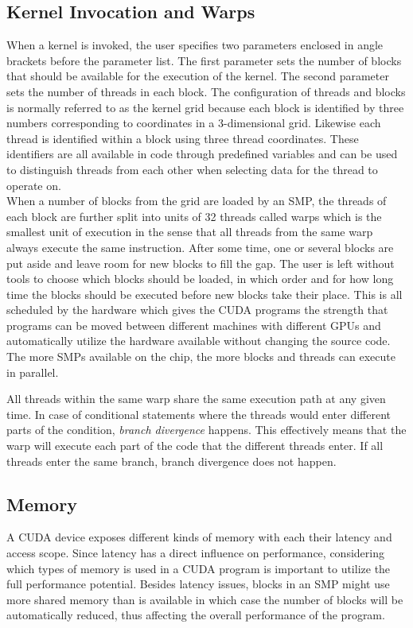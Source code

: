 \subsection{Kernel Invocation and Warps}
\label{sec:kernelandwarps}
When a kernel is invoked, the user specifies two parameters enclosed in angle brackets before the parameter list. The first parameter sets the number of blocks that should be available for the execution of the kernel. The second parameter sets the number of threads in each block. The configuration of threads and blocks is normally referred to as the kernel grid because each block is identified by three numbers corresponding to coordinates in a 3-dimensional grid. Likewise each thread is identified within a block using three thread coordinates. These identifiers are all available in code through predefined variables and can be used to distinguish threads from each other when selecting data for the thread to operate on.\\

When a number of blocks from the grid are loaded by an SMP, the threads of each block are further split into units of 32 threads called warps which is the smallest unit of execution in the sense that all threads from the same warp always execute the same instruction. After some time, one or several blocks are put aside and leave room for new blocks to fill the gap. The user is left without tools to choose which blocks should be loaded, in which order and for how long time the blocks should be executed before new blocks take their place. This is all scheduled by the hardware which gives the CUDA programs the strength that programs can be moved between different machines with different GPUs and automatically utilize the hardware available without changing the source code. The more SMPs available on the chip, the more blocks and threads can execute in parallel.

All threads within the same warp share the same execution path at any given time. In case of conditional statements where the threads would enter different parts of the condition, \emph{branch divergence} happens. This effectively means that the warp will execute each part of the code that the different threads enter. If all threads enter the same branch, branch divergence does not happen.

\subsection{Memory}
A CUDA device exposes different kinds of memory with each their latency and access scope. Since latency has a direct influence on performance, considering which types of memory is used in a CUDA program is important to utilize the full performance potential. Besides latency issues, blocks in an SMP might use more shared memory than is available in which case the number of blocks will be automatically reduced, thus affecting the overall performance of the program. \\

